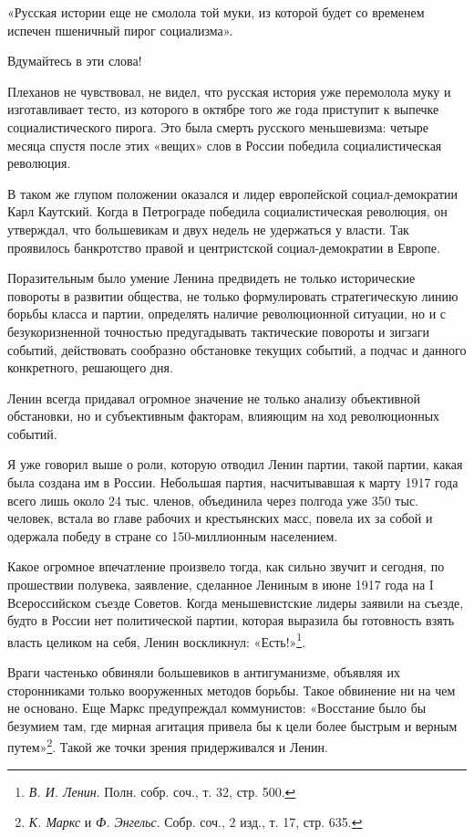 \documentclass[12pt, a4paper, openany]{book}
\begin{document}
«Русская истории еще не смолола той муки, из которой будет со временем испечен пшеничный пирог социализма».

Вдумайтесь в эти слова!

Плеханов не чувствовал, не видел, что русская история уже перемолола муку и изготавливает тесто, из которого в октябре того же года приступит к выпечке социалистического пирога. Это была смерть русского меньшевизма: четыре месяца спустя после этих «вещих» слов в России победила социалистическая революция.

В таком же глупом положении оказался и лидер европейской социал-демократии Карл Каутский. Когда в Петрограде победила социалистическая революция, он утверждал, что большевикам и двух недель не удержаться у власти. Так проявилось банкротство правой и центристской социал-демократии в Европе.

Поразительным было умение Ленина предвидеть не только исторические повороты в развитии общества, не только формулировать стратегическую линию борьбы класса и партии, определять наличие революционной ситуации, но и с безукоризненной точностью предугадывать тактические повороты и зигзаги событий, действовать сообразно обстановке текущих событий, а подчас и данного конкретного, решающего дня.

Ленин всегда придавал огромное значение не только анализу объективной обстановки, но и субъективным факторам, влияющим на ход революционных событий.

Я уже говорил выше о роли, которую отводил Ленин партии, такой партии, какая была создана им в России. Небольшая партия, насчитывавшая к марту 1917 года всего лишь около 24 тыс. членов, объединила через полгода уже 350 тыс. человек, встала во главе рабочих и крестьянских масс, повела их за собой и одержала победу в стране со 150-миллионным населением.

Какое огромное впечатление произвело тогда, как сильно звучит и сегодня, по прошествии полувека, заявление, сделанное Лениным в июне 1917 года на I Всероссийском съезде Советов. Когда меньшевистские лидеры заявили на съезде, будто в России нет политической партии, которая выразила бы готовность взять власть целиком на себя, Ленин воскликнул: «Есть!»\footnote{\textit{В. И. Ленин}. Полн. собр. соч., т. 32, стр. 500.}.

Враги частенько обвиняли большевиков в антигуманизме, объявляя их сторонниками только вооруженных методов борьбы. Такое обвинение ни на чем не основано. Еще Маркс предупреждал коммунистов: «Восстание было бы безумием там, где мирная агитация привела бы к цели более быстрым и верным путем»\footnote{\textit{К. Маркс} и \textit{Ф. Энгельс}. Собр. соч., 2 изд., т. 17, стр. 635.}. Такой же точки зрения придерживался и Ленин.
\end{document}
